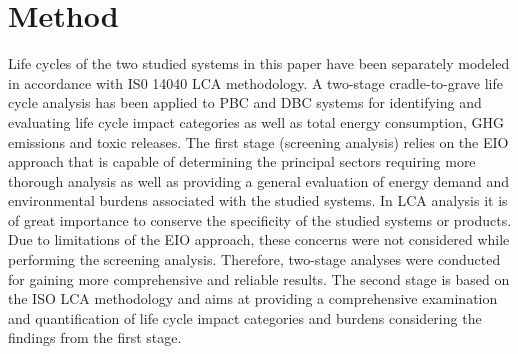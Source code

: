 \documentclass[conference]{IEEEtran}
\begin{document}
\section{Method}

Life cycles of the two studied systems in this paper have been separately modeled in accordance with IS0 14040 LCA methodology. A two-stage cradle-to-grave life cycle analysis has been applied to PBC and DBC systems for identifying and evaluating life cycle impact categories as well as  total energy consumption, GHG emissions and toxic releases. The first stage (screening analysis) relies on the EIO approach that is capable of determining the principal sectors requiring more thorough analysis as well as providing a general evaluation of energy demand and environmental burdens associated with the studied systems. In LCA analysis it is of great importance to conserve the specificity of the studied systems or products. Due to limitations of the EIO approach, these concerns were not considered while performing the screening analysis. Therefore, two-stage analyses were conducted for gaining more comprehensive and reliable results. The second stage is based on the ISO LCA methodology and aims at providing a comprehensive examination and quantification of life cycle impact categories and burdens considering the findings from the first stage.
\vspace{-2pt}
\end{document}
